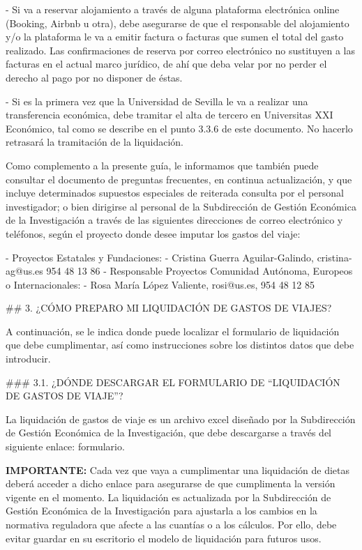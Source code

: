 \documentclass{article}
\begin{document}
\begin{itemize}
\begin{itemize}
\begin{scriptsize}
                  - Si va a reservar alojamiento a través de alguna plataforma electrónica online (Booking, Airbnb u otra), debe asegurarse de que el responsable del alojamiento y/o la plataforma le va a emitir factura o facturas que sumen el total del gasto realizado. Las confirmaciones de reserva por correo electrónico no sustituyen a las facturas en el actual marco jurídico, de ahí que deba velar por no perder el derecho al pago por no disponer de éstas.

                  - Si es la primera vez que la Universidad de Sevilla le va a realizar una transferencia económica, debe tramitar el alta de tercero en Universitas XXI Económico, tal como se describe en el punto 3.3.6 de este documento. No hacerlo retrasará la tramitación de la liquidación.

                  Como complemento a la presente guía, le informamos que también puede consultar el documento de preguntas frecuentes, en continua actualización, y que incluye determinados supuestos especiales de reiterada consulta por el personal investigador; o bien dirigirse al personal de la Subdirección de Gestión Económica de la Investigación a través de las siguientes direcciones de correo electrónico y teléfonos, según el proyecto donde desee imputar los gastos del viaje:

                  - Proyectos Estatales y Fundaciones:
                  - Cristina Guerra Aguilar-Galindo, cristina-ag@us.es 954 48 13 86
                  - Responsable Proyectos Comunidad Autónoma, Europeos o Internacionales:
                  - Rosa María López Valiente, rosi@us.es, 954 48 12 85

                  \#\# 3. ¿CÓMO PREPARO MI LIQUIDACIÓN DE GASTOS DE VIAJES?

                  A continuación, se le indica donde puede localizar el formulario de liquidación que debe cumplimentar, así como instrucciones sobre los distintos datos que debe introducir.

                  \#\#\# 3.1. ¿DÓNDE DESCARGAR EL FORMULARIO DE “LIQUIDACIÓN DE GASTOS DE VIAJE”?

                  La liquidación de gastos de viaje es un archivo excel diseñado por la Subdirección de Gestión Económica de la Investigación, que debe descargarse a través del siguiente enlace: formulario.

                  \textbf{IMPORTANTE:} Cada vez que vaya a cumplimentar una liquidación de dietas deberá acceder a dicho enlace para asegurarse de que cumplimenta la versión vigente en el momento. La liquidación es actualizada por la Subdirección de Gestión Económica de la Investigación para ajustarla a los cambios en la normativa reguladora que afecte a las cuantías o a los cálculos. Por ello, debe evitar guardar en su escritorio el modelo de liquidación para futuros usos.


\end{scriptsize}
\end{itemize}
\end{itemize}
\end{document}
